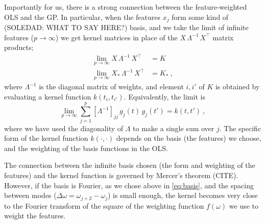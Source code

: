 \documentclass[12pt,letterpaper]{article}
\begin{document}
Importantly for us, there is a strong connection between the feature-weighted OLS and the GP.
In particular, when the features $x_j$ form some kind of (SOLEDAD: WHAT TO SAY HERE?) basis, and we take the limit of infinite features ($p\rightarrow\infty$) we get kernel matrices in place of the $X\,\Lambda^{-1}\,X^\top$ matrix products;
\begin{align}
    \lim_{p\rightarrow\infty} X\,\Lambda^{-1}\,X^\top &= K
    \\
    \lim_{p\rightarrow\infty} X_\ast\,\Lambda^{-1}\,X^\top &= K_\ast
    ~,
    \label{eq.limit}
\end{align}
where $\Lambda^{-1}$ is the diagonal matrix of weights, and element $i,i'$ of $K$ is obtained by evaluating a kernel function $k(t_i,t_{i'})$.
Equivalently, the limit is
\begin{equation}
    \lim_{p\rightarrow\infty} \sum_{j=1}^p [\Lambda^{-1}]_{jj}\,g_j(t)\,g_{j}(t') = k(t, t')
    ~,
\end{equation}
where we have used the diagonality of $\Lambda$ to make a single sum over $j$.
The specific form of the kernel function $k(\cdot,\cdot)$ depends on the basis (the features) we choose, and the weighting of the basis functions in the OLS.

The connection between the infinite basis chosen (the form and weighting of the features) and the kernel function is governed by Mercer's theorem (CITE).
However, if the basis is Fourier, as we chose above in \eqref{eq:basis}, and the spacing between modes ($\Delta\omega =\omega_{j+2}-\omega_j$) is small enough, the kernel becomes very close to the Fourier transform of the square of the weighting function $f(\omega)$ we use to weight the features.
\end{document}
